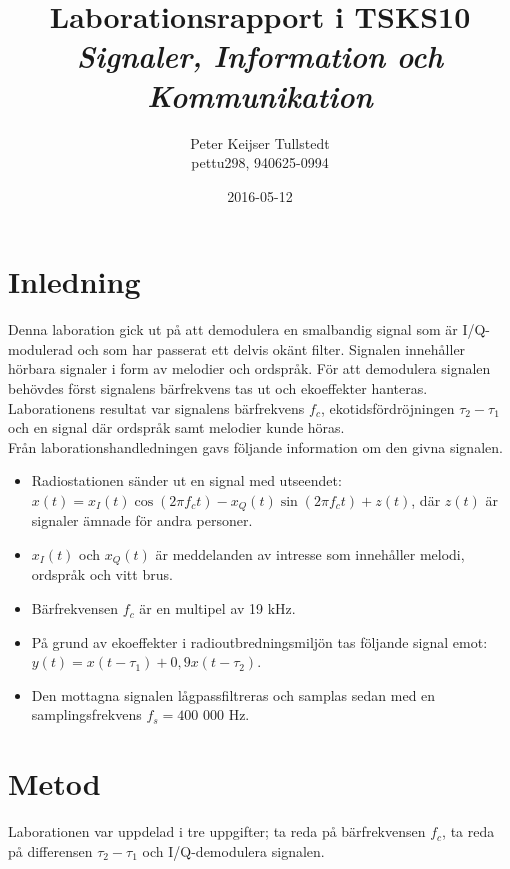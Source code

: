 \documentclass[10pt,twocolumn]{article}
\title{Laborationsrapport i TSKS10 \emph{Signaler, Information och Kommunikation}}
\author{Peter Keijser Tullstedt \\ pettu298, 940625-0994}
\date{2016-05-12}
\begin{document}
\maketitle

\section{Inledning}

Denna laboration gick ut på att demodulera en smalbandig signal som är I/Q-modulerad
och som har passerat ett delvis okänt filter. Signalen innehåller hörbara signaler i form av 
melodier och ordspråk. För att demodulera signalen behövdes först signalens bärfrekvens tas ut och ekoeffekter hanteras. Laborationens resultat var signalens bärfrekvens $f_c$, ekotidsfördröjningen $\tau_2 - \tau_1$ och en
signal där ordspråk samt melodier kunde höras.\\

Från laborationshandledningen gavs följande information om den givna signalen.
\begin{itemize}

	\item Radiostationen sänder ut en signal med utseendet:
		$x(t) = x_I(t)\cos(2\pi f_c t)-x_Q(t)\sin(2\pi f_c t)+z(t)$,
		där $z(t)$ är signaler ämnade för andra personer.

	\item $x_I(t)$ och $x_Q(t)$ är meddelanden av intresse som innehåller melodi, ordspråk och vitt brus.

	\item Bärfrekvensen $f_c$ är en multipel av 19 kHz.

	\item På grund av ekoeffekter i radioutbredningsmiljön tas följande signal emot:
		$y(t)=x(t - \tau_1)+0,9x(t - \tau_2)$.

	\item Den mottagna signalen lågpassfiltreras och samplas sedan med en samplingsfrekvens $f_s =400 $ 000 Hz.
	
\end{itemize}


\section{Metod}

Laborationen var uppdelad i tre uppgifter; ta reda på bärfrekvensen $f_c$, ta reda på differensen $\tau_2 - \tau_1$ och I/Q-demodulera signalen.
\end{document}
